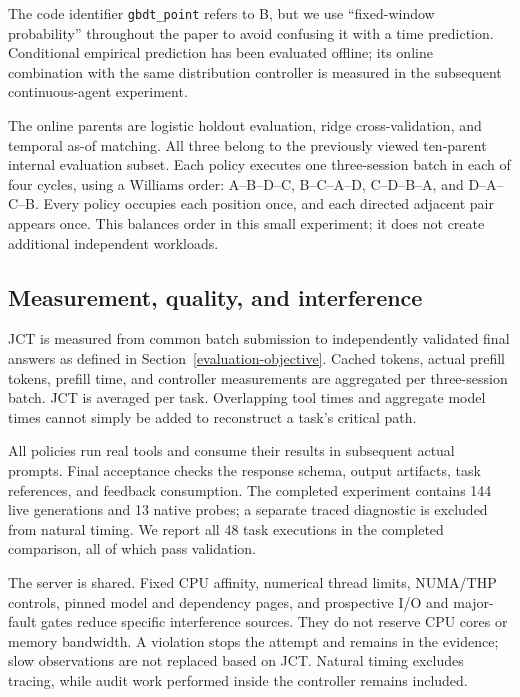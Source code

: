 \documentclass[sigconf, screen, review, balance=false]{acmart}
\begin{document}
The code identifier \nolinkurl{gbdt_point} refers to B, but we use
``fixed-window probability'' throughout the paper to avoid confusing it
with a time prediction. Conditional empirical prediction has been
evaluated offline; its online combination with the same distribution
controller is measured in the subsequent continuous-agent experiment.

The online parents are logistic holdout evaluation, ridge
cross-validation, and temporal as-of matching. All three belong to the
previously viewed ten-parent internal evaluation subset. Each policy
executes one three-session batch in each of four cycles, using a
Williams order: A--B--D--C, B--C--A--D, C--D--B--A, and D--A--C--B.
Every policy occupies each position once, and each directed adjacent
pair appears once. This balances order in this small experiment; it does
not create additional independent workloads.

\subsection{Measurement, quality, and
interference}\label{measurement-quality-and-interference}

JCT is measured from common batch submission to independently validated
final answers as defined in Section~\ref{evaluation-objective}. Cached tokens, actual prefill
tokens, prefill time, and controller measurements are aggregated per
three-session batch. JCT is averaged per task. Overlapping tool times
and aggregate model times cannot simply be added to reconstruct a task's
critical path.

All policies run real tools and consume their results in subsequent
actual prompts. Final acceptance checks the response schema, output
artifacts, task references, and feedback consumption. The completed
experiment contains 144 live generations and 13 native probes; a
separate traced diagnostic is excluded from natural timing. We report
all 48 task executions in the completed comparison, all of which pass
validation.

The server is shared. Fixed CPU affinity, numerical thread limits,
NUMA/THP controls, pinned model and dependency pages, and prospective
I/O and major-fault gates reduce specific interference sources. They do
not reserve CPU cores or memory bandwidth. A violation stops the attempt
and remains in the evidence; slow observations are not replaced based on
JCT. Natural timing excludes tracing, while audit work performed inside
the controller remains included.
\end{document}
